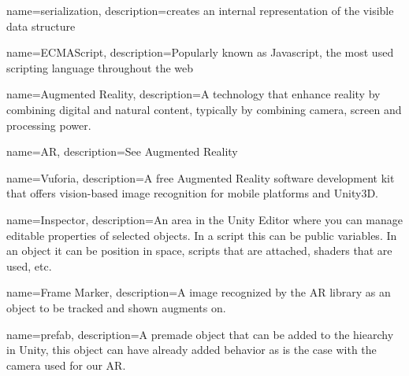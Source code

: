 {
	name=serialization,
	description={creates an internal representation of the visible data 
  				structure}
}

{
	name=ECMAScript,
	description={Popularly known as Javascript, the most used scripting
				language throughout the web}
}

{
	name=Augmented Reality,
	description={A technology that enhance reality by combining digital and
				natural content, typically by combining camera, screen and
				processing power.}
}

{
	name=AR,
	description={See \gls{Augmented Reality}}
}

{
	name=Vuforia,
	description={A free Augmented Reality software development kit that	offers
				vision-based image recognition for mobile platforms	and 
				Unity3D.}
}

{
	name=Inspector,
	description={An area in the Unity Editor where you can manage editable
	properties of selected objects. In a script this can be public
	variables. In an object it can be position in space, scripts that are 
	attached, shaders that are used, etc.}
}

{
	name=Frame Marker,
	description={A image recognized by the AR library as an object to be tracked and shown augments on.}
}

{
	name=prefab,
	description={A premade object that can be added to the hiearchy in Unity, this object can have already added behavior as is the case with the camera used for our \gls{AR}.}
}
